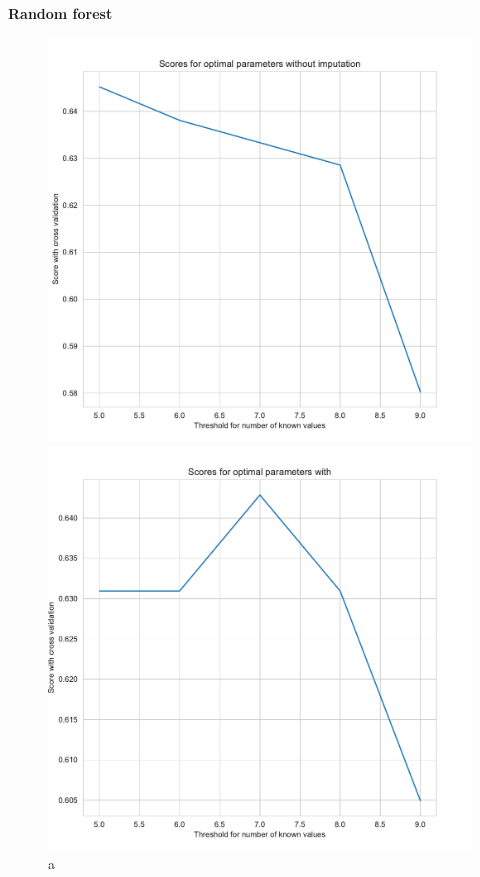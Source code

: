 \documentclass[11pt]{article}
\begin{document}
%
\textbf{Random forest }
%
\begin{figure}[h]
\begin{minipage}[l]{0.5\textwidth}
\includegraphics[width=1\linewidth]{bridges/threshold_grid_rdf0.pdf}
\end{minipage}
\begin{minipage}[l]{0.5\textwidth}
\includegraphics[width=1\linewidth]{bridges/threshold_grid_rdf1.pdf}
\end{minipage}
\caption{a}
\label{Fig:: RF_treshhold_grid}
\end{figure}
\end{document}
